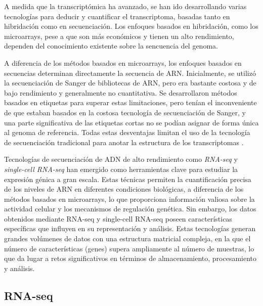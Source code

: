 A medida que la transcriptómica ha avanzado, se han ido desarrollando varias tecnologías para deducir y cuantificar el transcriptoma, basadas
tanto en hibridación como en secuenciación. Los enfoques basados en hibridación, como los microarrays, pese a que son más económicos y 
tienen un alto rendimiento, dependen del conocimiento existente sobre la sencuencia del genoma. \newline

A diferencia de los métodos basados en microarrays, los enfoques basados en secuencias determinan directamente la secuencia de ARN. Inicialmente, se utilizó
la secuenciación de Sanger de bibliotecas de ARN, pero era bastante costosa y de bajo rendimiento y generalmente no cuantitativa. Se 
desarrollaron métodos basados en etiquetas para superar estas limitaciones, pero tenían el inconveniente de que estaban basados en la 
costosa tecnología de secuenciación de Sanger, y una parte significativa de las etiquetas cortas no se podían asignar de forma única al
genoma de referencia. Todas estas desventajas limitan el uso de la tecnología de secuenciación tradicional para anotar la estructura de los 
transcriptomas \cite{transcriptomics-1}. \newline    


Tecnologías de secuenciación de ADN de alto rendimiento como \textit{RNA-seq} y \textit{single-cell RNA-seq} han emergido como herramientas 
clave para estudiar la expresión génica a gran escala. Estas técnicas permiten la cuantificación precisa de los niveles de ARN en diferentes 
condiciones biológicas, a diferencia de los métodos basados en microarrays, lo que proporciona información valiosa sobre la actividad celular 
y los mecanismos de regulación genética. Sin embargo, los datos obtenidos mediante RNA-seq y single-cell RNA-seq poseen características 
específicas que influyen en su representación y análisis. Estas tecnologías generan grandes volúmenes de datos con una estructura 
matricial compleja, en la que el número de características (genes) supera ampliamente al número de muestras, lo que da lugar a retos 
significativos en términos de almacenamiento, procesamiento y análisis.

\subsection{RNA-seq}

